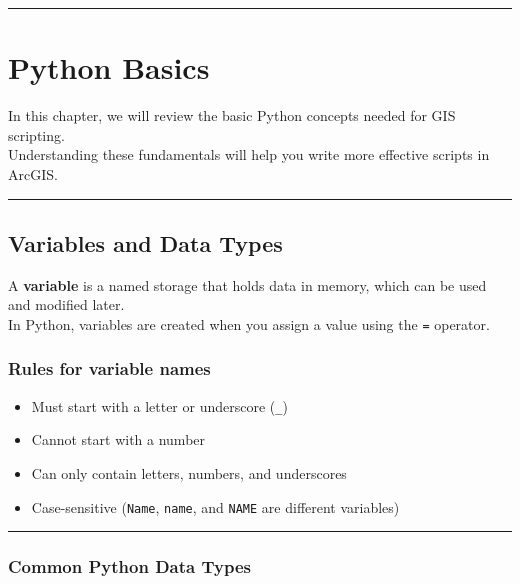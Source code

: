 \documentclass[
  11pt,
  letterpaper,
]{book}
\providecommand{\tightlist}{%
  \setlength{\itemsep}{0pt}\setlength{\parskip}{0pt}}
\begin{document}
\begin{center}\rule{0.5\linewidth}{0.5pt}\end{center}

\chapter{Python Basics}\label{python-basics}

In this chapter, we will review the basic Python concepts needed for GIS
scripting.\\
Understanding these fundamentals will help you write more effective
scripts in ArcGIS.

\begin{center}\rule{0.5\linewidth}{0.5pt}\end{center}

\section{Variables and Data Types}\label{variables-and-data-types}

A \textbf{variable} is a named storage that holds data in memory, which
can be used and modified later.\\
In Python, variables are created when you assign a value using the
\texttt{=} operator.

\subsection{Rules for variable names}\label{rules-for-variable-names}

\begin{itemize}
\tightlist
\item
  Must start with a letter or underscore (\texttt{\_})\\
\item
  Cannot start with a number\\
\item
  Can only contain letters, numbers, and underscores\\
\item
  Case-sensitive (\texttt{Name}, \texttt{name}, and \texttt{NAME} are
  different variables)
\end{itemize}

\begin{center}\rule{0.5\linewidth}{0.5pt}\end{center}

\subsection{Common Python Data Types}\label{common-python-data-types}
\end{document}
